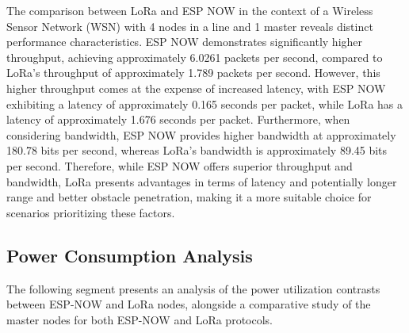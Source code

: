 The comparison between LoRa and ESP NOW in the context of a Wireless Sensor Network (WSN) with 4 nodes in a line and 1 master reveals distinct performance characteristics. ESP NOW demonstrates significantly higher throughput, achieving approximately 6.0261 packets per second, compared to LoRa's throughput of approximately 1.789 packets per second. However, this higher throughput comes at the expense of increased latency, with ESP NOW exhibiting a latency of approximately 0.165 seconds per packet, while LoRa has a latency of approximately 1.676 seconds per packet. Furthermore, when considering bandwidth, ESP NOW provides higher bandwidth at approximately 180.78 bits per second, whereas LoRa's bandwidth is approximately 89.45 bits per second. Therefore, while ESP NOW offers superior throughput and bandwidth, LoRa presents advantages in terms of latency and potentially longer range and better obstacle penetration, making it a more suitable choice for scenarios prioritizing these factors.







\subsection{Power Consumption Analysis}\label{sec:power_consumption_analysis}
The following segment presents an analysis of the power utilization contrasts between ESP-NOW and LoRa nodes, alongside a comparative study of the master nodes for both ESP-NOW and LoRa protocols.

